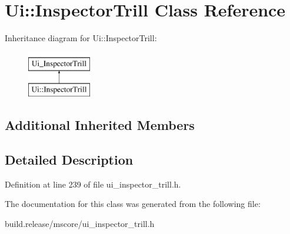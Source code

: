 \hypertarget{class_ui_1_1_inspector_trill}{}\section{Ui\+:\+:Inspector\+Trill Class Reference}
\label{class_ui_1_1_inspector_trill}
Inheritance diagram for Ui\+:\+:Inspector\+Trill\+:\begin{figure}[H]
\begin{center}
\leavevmode
\includegraphics[height=2.000000cm]{class_ui_1_1_inspector_trill}
\end{center}
\end{figure}
\subsection*{Additional Inherited Members}


\subsection{Detailed Description}


Definition at line 239 of file ui\+\_\+inspector\+\_\+trill.\+h.



The documentation for this class was generated from the following file\+:\begin{DoxyCompactItemize}
\item 
build.\+release/mscore/ui\+\_\+inspector\+\_\+trill.\+h\end{DoxyCompactItemize}
